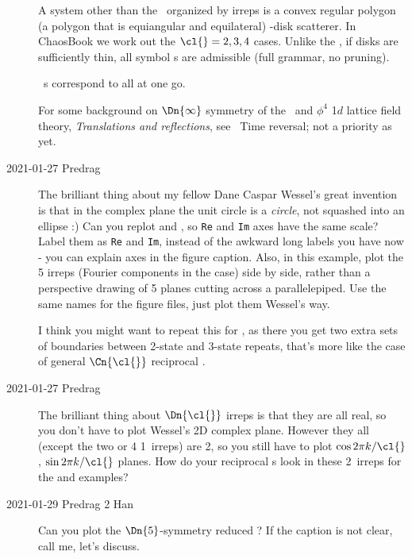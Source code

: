 \begin{description}
A system other than
the \templatt\ organized by  irreps is a convex regular
polygon (a polygon that is equiangular and equilateral) \cl{}-disk
scatterer. In ChaosBook we work out the $\cl{}=2,3,4$ cases.
Unlike the \templatt, if disks are sufficiently thin, all symbol {\brick}s
are admissible (full grammar, no pruning).

\tempLatt\ {\lattstate}s correspond to all \cl{} at one go.

     {
For some background on $\Dn{\infty}$ symmetry of the \templatt\ and
{$\phi^4$} 1$d$ lattice field theory,  {\em
Translations and reflections}, see ~{Time reversal};
not a priority as yet.
    }

    \item[2021-01-27 Predrag]
The brilliant thing about my fellow Dane
 {Caspar Wessel}'s
great invention is that in the complex plane the unit circle is a
\emph{circle}, not squashed into an ellipse :) Can you replot
 and
, so \texttt{Re} and \texttt{Im} axes have
the same scale? Label them as \texttt{Re} and \texttt{Im}, instead of the
awkward long labels you have now - you can explain axes in the figure
caption. Also, in this  example, plot the 5 irreps (Fourier
components in the  case) side by side, rather than a perspective
drawing of 5 planes cutting across a parallelepiped. Use the same names
for the figure files, just plot them Wessel's way.

I think you might want to repeat this for , as there you get two
extra sets of boundaries between 2-state and 3-state repeats, that's more
like the case of general $\Cn{\cl{}}$ reciprocal {\lattstate}.

    \item[2021-01-27 Predrag]
The brilliant thing about $\Dn{\cl{}}$ irreps is that they are all real, so you
don't have to plot Wessel's 2D complex plane. However they all (except
the two or 4 1\dmn\ irreps) are 2\dmn, so you still have to plot
$\cos2\pi{k}/\cl{}$, $\sin2\pi{k}/\cl{}$ planes. How do your reciprocal {\lattstate}s look in
these 2\dmn\ irreps for the  and   examples?

    \item[2021-01-29 Predrag 2 Han]
Can you plot the $\Dn{5}$-symmetry reduced ? If
the caption is not clear, call me, let's discuss.


\end{description}
